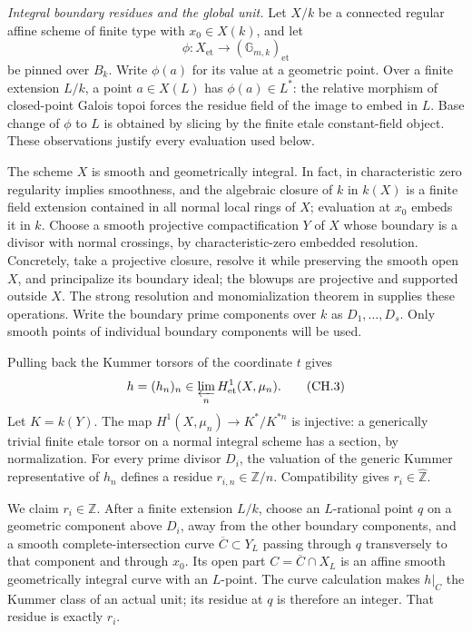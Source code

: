 \emph{Integral boundary residues and the global unit.}
Let $X/k$ be a connected regular affine scheme of finite type with
$x_0\in X(k)$, and let
\[
       \phi:X_{\mathrm{et}}\longrightarrow
                        (\mathbb G_{m,k})_{\mathrm{et}}
\]
be pinned over $B_k$. Write $\phi(a)$ for its value at a geometric
point. Over a finite extension $L/k$, a point $a\in X(L)$ has
$\phi(a)\in L^*$: the relative morphism of closed-point Galois topoi
forces the residue field of the image to embed in $L$. Base change of
$\phi$ to $L$ is obtained by slicing by the finite etale constant-field
object. These observations justify every evaluation used below.

The scheme $X$ is smooth and geometrically integral. In fact, in
characteristic zero regularity implies smoothness, and the algebraic
closure of $k$ in $k(X)$ is a finite field extension contained in all
normal local rings of $X$; evaluation at $x_0$ embeds it in $k$.
Choose a smooth projective compactification $Y$ of $X$ whose boundary
is a divisor with normal crossings, by characteristic-zero embedded
resolution. Concretely, take a projective closure, resolve it while
preserving the smooth open $X$, and principalize its boundary ideal;
the blowups are projective and supported outside $X$. The strong
resolution and monomialization theorem in
\cite[``The result'' and ``Idea of proof'', pp.~1--3]{FA_EncinasHauser2002}
supplies these operations. Write the boundary prime components over
$k$ as $D_1,\ldots,D_s$.
Only smooth points of individual boundary components will be used.

Pulling back the Kummer torsors of the coordinate $t$ gives
\[
       h=(h_n)_n\in\varprojlim_n H^1_{\mathrm{et}}(X,\mu_n).
                                                               \tag{CH.3}
\]
Let $K=k(Y)$. The map
$H^1(X,\mu_n)\to K^*/K^{*n}$ is injective: a generically trivial
finite etale torsor on a normal integral scheme has a section, by
normalization. For every prime divisor $D_i$, the valuation of the
generic Kummer representative of $h_n$ defines a residue
$r_{i,n}\in\mathbb Z/n$. Compatibility gives
$r_i\in\widehat{\mathbb Z}$.

We claim $r_i\in\mathbb Z$. After a finite extension $L/k$, choose
an $L$-rational point $q$ on a geometric component above $D_i$, away
from the other boundary components, and a smooth complete-intersection
curve $\overline C\subset Y_L$ passing through $q$ transversely to
that component and through $x_0$. Its open part
$C=\overline C\cap X_L$ is an affine smooth geometrically integral
curve with an $L$-point. The curve calculation makes $h|_C$ the Kummer
class of an actual unit; its residue at $q$ is therefore an integer.
That residue is exactly $r_i$.

